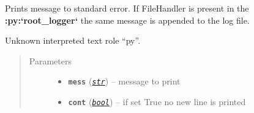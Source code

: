 \documentclass[a4paper,10pt,english]{sphinxmanual}
\begin{document}
\begin{fulllineitems}
\label{aqueduct.utils.clui:aqueduct.utils.clui.emit_message_to_file_in_root_logger}
\end{fulllineitems}


\begin{fulllineitems}
\label{aqueduct.utils.clui:aqueduct.utils.clui.message}
Prints message to standard error.
If FileHandler is present in the {\color{red}\bfseries{}:py:{}`root\_logger{}`} the same message is appended to the log file.

Unknown interpreted text role ``py''.

\begin{quote}\begin{description}
\item[{Parameters}] \leavevmode\begin{itemize}
\item {} 
\textbf{\texttt{mess}} (\href{http://docs.python.org/2/library/functions.html\#str}{\emph{\texttt{str}}}) -- message to print

\item {} 
\textbf{\texttt{cont}} (\href{http://docs.python.org/2/library/functions.html\#bool}{\emph{\texttt{bool}}}) -- if set True no new line is printed

\end{itemize}

\end{description}\end{quote}

\end{fulllineitems}

\end{document}
